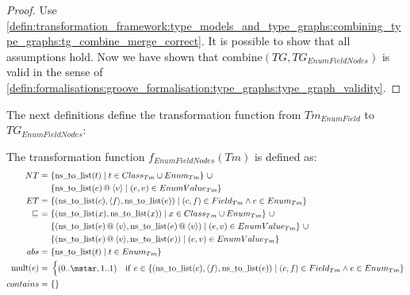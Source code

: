 \begin{proof}
Use \cref{defin:transformation_framework:type_models_and_type_graphs:combining_type_graphs:tg_combine_merge_correct}. It is possible to show that all assumptions hold. Now we have shown that $\mathrm{combine}(TG, TG_{EnumFieldNodes})$ is valid in the sense of \cref{defin:formalisations:groove_formalisation:type_graphs:type_graph_validity}.
\end{proof}

The next definitions define the transformation function from $Tm_{EnumField}$ to $TG_{EnumFieldNodes}$:

\begin{defin}
\label{defin:library_of_transformations:type_level_transformations:enum_fields:tmod_enum_field_to_tg_enum_as_node_types_field_as_edge_type}
The transformation function $f_{EnumFieldNodes}(Tm)$ is defined as:
\begin{align*}
NT =\ &\{\mathrm{ns\_\!to\_\!list}(t) \mid t \in Class_{Tm} \cup Enum_{Tm}\}\ \cup \\&\{ \mathrm{ns\_\!to\_\!list}(e) \append \langle v \rangle \mid (e, v) \in EnumValue_{Tm} \}\\
ET =\ &\{(\mathrm{ns\_\!to\_\!list}(c), \langle f \rangle, \mathrm{ns\_\!to\_\!list}(e)) \mid (c, f) \in Field_{Tm} \land e \in Enum_{Tm}\} \\
\!\!\sqsubseteq\ =\ &\{(\mathrm{ns\_\!to\_\!list}(x), \mathrm{ns\_\!to\_\!list}(x)) \mid x \in Class_{Tm} \cup Enum_{Tm} \}\ \cup \\&
\{(\mathrm{ns\_\!to\_\!list}(e) \append \langle v \rangle, \mathrm{ns\_\!to\_\!list}(e) \append \langle v \rangle) \mid (e, v) \in EnumValue_{Tm} \}\ \cup \\&
\{(\mathrm{ns\_\!to\_\!list}(e) \append \langle v \rangle, \mathrm{ns\_\!to\_\!list}(e)) \mid (e, v) \in EnumValue_{Tm} \} \\
abs =\ &\{\mathrm{ns\_\!to\_\!list}(t) \mid t \in Enum_{Tm}\}\ \\
\mathrm{mult}(e) =\ &\begin{cases}
    (0..\mstar, 1..1) &\mathrm{if}\ e \in \{(\mathrm{ns\_\!to\_\!list}(c), \langle f \rangle, \mathrm{ns\_\!to\_\!list}(e)) \mid (c, f) \in Field_{Tm} \land e \in Enum_{Tm}\}
\end{cases} \\
contains =\ &\{\}
\end{align*}
\end{defin}

